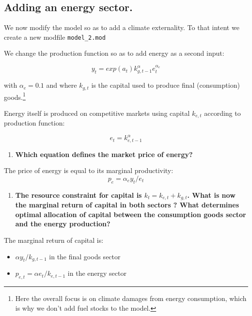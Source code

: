 \documentclass[
  letterpaper,
  DIV=11,
  numbers=noendperiod]{scrartcl}
\providecommand{\tightlist}{%
  \setlength{\itemsep}{0pt}\setlength{\parskip}{0pt}}\usepackage{longtable,booktabs,array}
\begin{document}
\hypertarget{adding-an-energy-sector.}{%
\subsection{Adding an energy sector.}\label{adding-an-energy-sector.}}

We now modify the model so as to add a climate externality. To that
intent we create a new modfile \texttt{model\_2.mod}

We change the production function so as to add energy as a second input:

\[y_t = exp(a_t) k_{g,t-1}^{\alpha}e_t^{\alpha_e}\]

with \(\alpha_e=0.1\) and where \(k_{g,t}\) is the capital used to
produce final (consumption) goods.\footnote{Here the overall focus is on
  climate damages from energy consumption, which is why we don't add
  fuel stocks to the model.}

Energy itself is produced on competitive markets using capital
\(k_{e,t}\) according to production function:

\[e_{t} = k_{e,t-1}^{\alpha}\]

\begin{enumerate}
\def\labelenumi{\arabic{enumi}.}
\setcounter{enumi}{5}
\tightlist
\item
  \textbf{Which equation defines the market price of energy?}
\end{enumerate}

The price of energy is equal to its marginal productivity:
\[p_e = \alpha_e y_t / e_t\]

\begin{enumerate}
\def\labelenumi{\arabic{enumi}.}
\setcounter{enumi}{6}
\tightlist
\item
  \textbf{The resource constraint for capital is
  \(k_t = k_{e,t} + k_{g,t}\). What is now the marginal return of
  capital in both sectors ? What determines optimal allocation of
  capital between the consumption goods sector and the energy
  production?}
\end{enumerate}

The marginal return of capital is:

\begin{itemize}
\tightlist
\item
  \(\alpha y_t / k_{g,t-1}\) in the final goods sector
\item
  \(p_{e,t} = \alpha e_t / k_{e,t-1}\) in the energy sector
\end{itemize}
\end{document}
